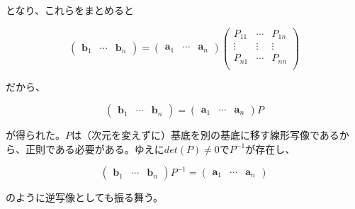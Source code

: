 \documentclass[dvipdfmx,autodetect-engine]{jsarticle}
\theoremstyle{definition}
\begin{document}
となり、これらをまとめると

$$
\begin{pmatrix}
\bm{b}_1 & \cdots & \bm{b}_n
\end{pmatrix} = 
\begin{pmatrix}
\bm{a}_1 & \cdots & \bm{a}_n
\end{pmatrix}
\begin{pmatrix}
P_{11} & \cdots & P_{1n} \\
\vdots & \vdots & \vdots \\
P_{n1} & \cdots & P_{nn} \\
\end{pmatrix}
$$

だから、

$$
\begin{pmatrix}
\bm{b}_1 & \cdots & \bm{b}_n
\end{pmatrix} = 
\begin{pmatrix}
\bm{a}_1 & \cdots & \bm{a}_n
\end{pmatrix}P
$$

が得られた。$P$は（次元を変えずに）基底を別の基底に移す線形写像であるから、正則である必要がある。ゆえに$det(P) \neq 0$で$P^{-1}$が存在し、

$$
\begin{pmatrix}
\bm{b}_1 & \cdots & \bm{b}_n
\end{pmatrix}P^{-1} = 
\begin{pmatrix}
\bm{a}_1 & \cdots & \bm{a}_n
\end{pmatrix}
$$

のように逆写像としても振る舞う。
\end{document}
